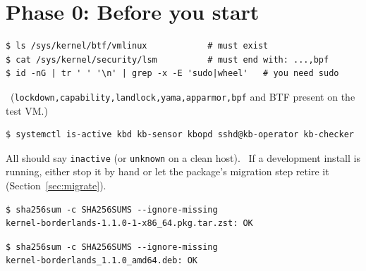 \section{Phase 0: Before you start}
\resetsteps
{}
\begin{lstlisting}[style=console]
$ ls /sys/kernel/btf/vmlinux            # must exist
$ cat /sys/kernel/security/lsm          # must end with: ...,bpf
$ id -nG | tr ' ' '\n' | grep -x -E 'sudo|wheel'   # you need sudo
\end{lstlisting}
\verified\ (\texttt{lockdown,capability,landlock,yama,apparmor,bpf} and BTF present on the test VM.)
\begin{lstlisting}[style=console]
$ systemctl is-active kbd kb-sensor kbopd sshd@kb-operator kb-checker
\end{lstlisting}
All should say \texttt{inactive} (or \texttt{unknown} on a clean host). \verified\ If a development install is running, either
stop it by hand or let the package's migration step retire it (Section~\ref{sec:migrate}).
\ifarch
\begin{lstlisting}[style=console]
$ sha256sum -c SHA256SUMS --ignore-missing
kernel-borderlands-1.1.0-1-x86_64.pkg.tar.zst: OK
\end{lstlisting}
\else
\begin{lstlisting}[style=console]
$ sha256sum -c SHA256SUMS --ignore-missing
kernel-borderlands_1.1.0_amd64.deb: OK
\end{lstlisting}
\fi
\verified

